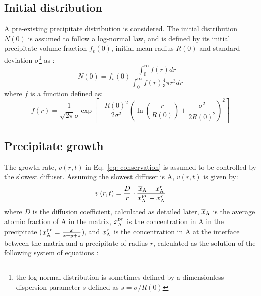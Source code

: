\documentclass[11pt]{scrartcl}
\newcommand{\eref}[1]{Eq.~\eqref{#1}}
\begin{document}
\subsection{Initial distribution}
A pre-existing precipitate distribution is considered. The initial distribution $N(0)$ is assumed to follow a log-normal law, and is defined by its initial precipitate volume fraction \hypertarget{vf}{$f_{v}(0)$}, initial mean radius \hypertarget{r0}{$R(0)$} and standard deviation \hypertarget{sigma}{$\sigma$}\footnote{the log-normal distribution is sometimes defined by a dimensionless dispersion parameter $s$ defined as $s=\sigma/R(0)$} as \cite{Bignon2022}:
\begin{equation} \label{eq:number_density}
N(0)  =f_{v}(0)\frac{\int_{0}^{\infty} f(r) dr}{\int_{0}^{\infty} f(r) \frac{4}{3} \pi r^{3}dr}
\end{equation}
%
where $f$ is a function defined as:
%
\begin{equation} \label{eq:distribution_function}
f(r)=\frac{1}{\sqrt{2 \pi} \sigma} \exp\left[{-\frac{R(0)^{2}}{2 \sigma^{2}} \left(\ln(\frac{r}{R(0)})+ \frac{\sigma^{2}}{2R(0)^{2}}\right)^{2}}\right]
\end{equation}


\subsection{Precipitate growth}
The growth rate, $v\left(r,t\right)$ in \eref{eq: conservation} is assumed to be controlled by the slowest diffuser. Assuming the slowest diffuser is A,  $v\left(r,t\right)$ is given by:
\begin{equation} \label{eq:growth_rate}
v\left(r,t\right)=\frac{D}{r}\cdot \frac{\overline{x}_{ \tiny \textrm{A}} - x_{ \tiny \textrm{A}}^{r}}{x_{ \tiny \textrm{A}}^{\textrm pr} -  x_{ \tiny \textrm{A}}^{r} }
\end{equation}
where $D$ is the diffusion coefficient, calculated as detailed later,  $\overline{x}_{ \tiny \textrm{A}}$ is the average atomic fraction of A in the matrix, \hypertarget{xpr_a}{$x_{ \tiny \textrm{A}}^{\textrm pr}$} is the concentration in A in the precipitate ($x_{ \tiny \textrm{A}}^{\textrm pr} = \frac{x}{x+y+z}$), and $x_{ \tiny \textrm{A}}^{r}$ is the concentration in A at the interface between the matrix and a precipitate of radius $r$, calculated as the solution of the following system of equations \cite{ Nicolas2003,Bignon2022}: 
%
\end{document}
